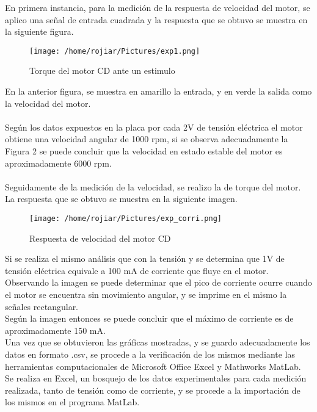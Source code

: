 \documentclass[a4paper,10pt,twocolumn]{article}
\begin{document}
En primera instancia, para la medición de la respuesta de velocidad del motor, se aplico una señal de entrada cuadrada y la respuesta que se obtuvo 
se muestra en la siguiente figura.

\begin{figure}[h!]
\centering
\texttt{[image: /home/rojiar/Pictures/exp1.png]}
\caption{Torque del motor CD ante un estimulo}
\label{Torque del motor CD ante un estimulo}
\end{figure}

En la anterior figura, se muestra en amarillo la entrada, y en verde la salida como la velocidad del motor.
\\\\
Según los datos expuestos en la placa por cada 2V de tensión eléctrica el motor obtiene una velocidad angular de 1000 rpm, si se observa
adecuadamente la Figura 2 se puede concluir que la velocidad en estado estable del motor es aproximadamente 6000 rpm.
\\\\
Seguidamente de la medición de la velocidad, se realizo la de torque del motor. La respuesta que se obtuvo se muestra en la siguiente imagen.
\newpage

\begin{figure}[h]
\centering
\texttt{[image: /home/rojiar/Pictures/exp\_corri.png]}
\caption{Respuesta de velocidad del motor CD}
\label{Respuesta de velocidad del motor CD}
\end{figure}

Si se realiza el mismo análisis que con la tensión y se determina que 1V de tensión eléctrica equivale a 100 mA de corriente que fluye en el 
motor. Observando la imagen se puede determinar que el pico de corriente ocurre cuando el motor se encuentra sin movimiento angular, y se imprime
en el mismo la señales rectangular.\\

Según la imagen entonces se puede concluir que el máximo de corriente es de aproximadamente 150 mA.\\

Una vez que se obtuvieron las gráficas mostradas, y se guardo adecuadamente los datos en formato .csv, se procede a la verificación de los mismos 
mediante las herramientas computacionales de Microsoft Office Excel y Mathworks MatLab.\\

Se realiza en Excel, un bosquejo de los datos experimentales para cada medición realizada, tanto de tensión como de corriente, y se procede a 
la importación de los mismos en el programa MatLab. \\
\end{document}
